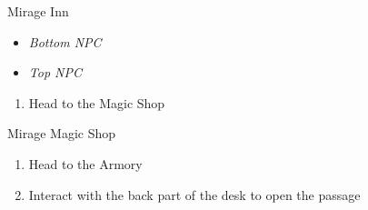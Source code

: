 \begin{paracol}{2}
\begin{shop}{Mirage Inn}
    \varwb
    \begin{itemize}
        \item \textit{Bottom NPC}
    \end{itemize}
    \begin{sell}
        \item {}
        \item \kunai
        \item \knife
        \item \ribbon
        \item \boneMail
    \end{sell}
    \begin{buy}
        \item {} \heroDrink \space {}
        \item {} \speedDrink \space {}
        \item {} \revivify \space {}
    \end{buy}
    \begin{itemize}
        \item \textit{Top NPC}
    \end{itemize}
    \begin{buy}
        \item {} \phoenixDown \space {}
        \item {} \maidensKiss \space {}
        \item {} \antidote \space {}
    \end{buy}
    \varwe
\end{shop}

\begin{enumerate}[resume]
    \item Head to the Magic Shop
\end{enumerate}

\begin{shop}{Mirage Magic Shop}
    \varwb
    \begin{buy}
        \item {} \size
        \item {} \float
    \end{buy}
    \varwe
\end{shop}

\begin{enumerate}[resume]
    \item Head to the Armory
    \item Interact with the back part of the desk to open the passage
\end{enumerate}


\end{paracol}
